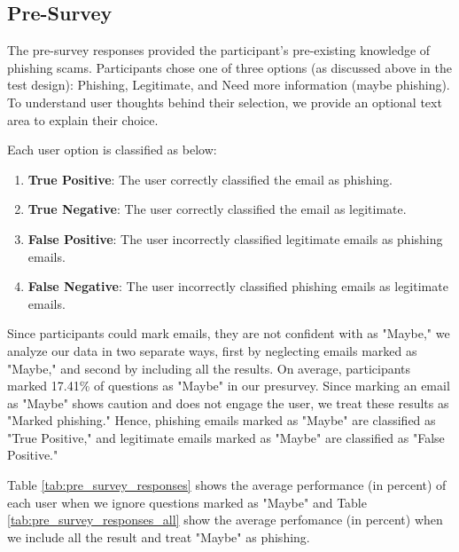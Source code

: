 \subsection{Pre-Survey}
The pre-survey responses provided the participant's pre-existing knowledge of phishing scams. Participants chose one of three options (as discussed above in the test design): Phishing, Legitimate, and Need more information (maybe phishing). To understand user thoughts behind their selection, we provide an optional text area to explain their choice.

Each user option is classified as below:

\begin{enumerate}
    \setlength{\itemsep}{0pt}
    \setlength{\parskip}{0pt}
    \setlength{\topsep}{0pt}
    \item \textbf{True Positive}: The user correctly classified the email as phishing.
    \item \textbf{True Negative}: The user correctly classified the email as legitimate.
    \item \textbf{False Positive}: The user incorrectly classified legitimate emails as phishing emails.
    \item \textbf{False Negative}: The user incorrectly classified phishing emails as legitimate emails.
\end{enumerate}

Since participants could mark emails, they are not confident with as "Maybe," we analyze our data in two separate ways, first by neglecting emails marked as "Maybe," and second by including all the results. On average, participants marked 17.41\% of questions as "Maybe" in our presurvey. Since marking an email as "Maybe" shows caution and does not engage the user, we treat these results as "Marked phishing." Hence, phishing emails marked as "Maybe" are classified as "True Positive," and legitimate emails marked as "Maybe" are classified as "False Positive."

Table \ref{tab:pre_survey_responses} shows the average performance (in percent) of each user when we ignore questions marked as "Maybe" and Table \ref{tab:pre_survey_responses_all} show the average perfomance (in percent) when we include all the result and treat "Maybe" as phishing.

